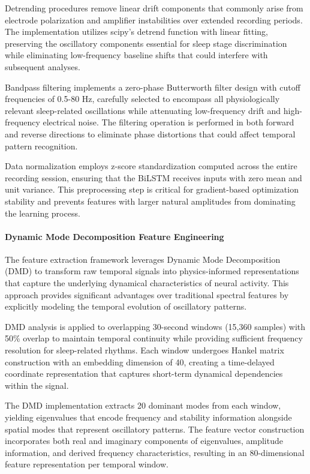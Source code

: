 \documentclass[a4paper,12pt,twoside]{article}
\begin{document}
Detrending procedures remove linear drift components that commonly arise from electrode polarization and amplifier instabilities over extended recording periods. The implementation utilizes scipy's detrend function with linear fitting, preserving the oscillatory components essential for sleep stage discrimination while eliminating low-frequency baseline shifts that could interfere with subsequent analyses.

Bandpass filtering implements a zero-phase Butterworth filter design with cutoff frequencies of 0.5-80 Hz, carefully selected to encompass all physiologically relevant sleep-related oscillations while attenuating low-frequency drift and high-frequency electrical noise. The filtering operation is performed in both forward and reverse directions to eliminate phase distortions that could affect temporal pattern recognition.

Data normalization employs z-score standardization computed across the entire recording session, ensuring that the BiLSTM receives inputs with zero mean and unit variance. This preprocessing step is critical for gradient-based optimization stability and prevents features with larger natural amplitudes from dominating the learning process.

\paragraph{Dynamic Mode Decomposition Feature Engineering}

The feature extraction framework leverages Dynamic Mode Decomposition (DMD) to transform raw temporal signals into physics-informed representations that capture the underlying dynamical characteristics of neural activity. This approach provides significant advantages over traditional spectral features by explicitly modeling the temporal evolution of oscillatory patterns.

DMD analysis is applied to overlapping 30-second windows (15,360 samples) with 50\% overlap to maintain temporal continuity while providing sufficient frequency resolution for sleep-related rhythms. Each window undergoes Hankel matrix construction with an embedding dimension of 40, creating a time-delayed coordinate representation that captures short-term dynamical dependencies within the signal.

The DMD implementation extracts 20 dominant modes from each window, yielding eigenvalues that encode frequency and stability information alongside spatial modes that represent oscillatory patterns. The feature vector construction incorporates both real and imaginary components of eigenvalues, amplitude information, and derived frequency characteristics, resulting in an 80-dimensional feature representation per temporal window.
\end{document}
